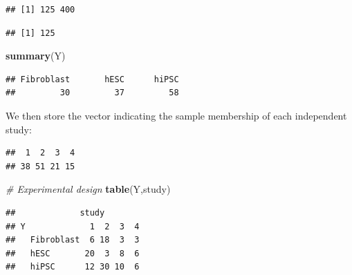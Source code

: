 \documentclass[]{book}
\newenvironment{Shaded}{\begin{snugshade}}{\end{snugshade}}
\newcommand{\KeywordTok}[1]{\textcolor[rgb]{0.13,0.29,0.53}{\textbf{#1}}}
\newcommand{\StringTok}[1]{\textcolor[rgb]{0.31,0.60,0.02}{#1}}
\newcommand{\CommentTok}[1]{\textcolor[rgb]{0.56,0.35,0.01}{\textit{#1}}}
\newcommand{\OperatorTok}[1]{\textcolor[rgb]{0.81,0.36,0.00}{\textbf{#1}}}
\newcommand{\NormalTok}[1]{#1}
\begin{document}
\begin{verbatim}
## [1] 125 400
\end{verbatim}

\begin{Shaded}
\end{Shaded}

\begin{verbatim}
## [1] 125
\end{verbatim}

\begin{Shaded}
\begin{Highlighting}[]
\KeywordTok{summary}\NormalTok{(Y)}
\end{Highlighting}
\end{Shaded}

\begin{verbatim}
## Fibroblast       hESC      hiPSC 
##         30         37         58
\end{verbatim}

We then store the vector indicating the sample membership of each
independent study:

\begin{Shaded}
\end{Shaded}

\begin{verbatim}
##  1  2  3  4 
## 38 51 21 15
\end{verbatim}

\begin{Shaded}
\begin{Highlighting}[]
\CommentTok{# Experimental design}
\KeywordTok{table}\NormalTok{(Y,study)}
\end{Highlighting}
\end{Shaded}

\begin{verbatim}
##             study
## Y             1  2  3  4
##   Fibroblast  6 18  3  3
##   hESC       20  3  8  6
##   hiPSC      12 30 10  6
\end{verbatim}
\end{document}
